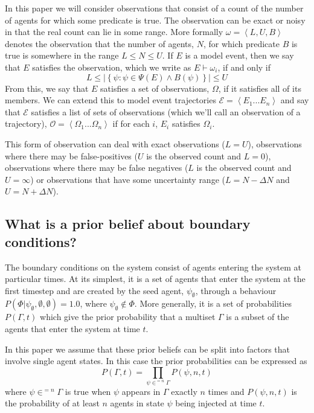\documentclass{article}
\begin{document}
In this paper we will consider observations that consist of a count of the number of agents for which some predicate is true. The observation can be exact or noisy in that the real count can lie in some range. More formally $\omega = \left<L,U,B\right>$ denotes the observation that the number of agents, $N$, for which predicate $B$ is true is somewhere in the range  $L \le N \le U$. If $E$ is a model event,  then we say that $E$ satisfies the observation, which we write as $E \vdash \omega_i$, if and only if
\[
L \le \left|\left\{\psi:\psi \in \Psi(E) \wedge B(\psi)\right\}\right| \le U
\]
From this, we say that $E$ satisfies a set of observations, $\Omega$, if it satisfies all of its members. We can extend this to model event trajectories $\mathcal{E} = \left<E_1...E_n\right>$ and say that $\mathcal{E}$ satisfies a list of sets of observations (which we'll call an observation of a trajectory), $\mathcal{O} = \left<\Omega_1...\Omega_n\right>$ if for each $i$, $E_i$ satisfies $\Omega_i$.

This form of observation can deal with exact observations ($L=U$), observations where there may be false-positives ($U$ is the observed count and $L=0$), observations where there may be false negatives ($L$ is the observed count and $U=\infty$) or observations that have some uncertainty range ($L = N - \Delta N$ and $U = N + \Delta N$).
 
\subsection{What is a prior belief about boundary conditions?}

The boundary conditions on the system consist of agents entering the system at particular times. At its simplest, it is a set of agents that enter the system at the first timestep and are created by the seed agent, $\psi_\emptyset$, through a behaviour $P(\Phi|\psi_\emptyset,\emptyset,\emptyset)=1.0$, where $\psi_\emptyset \notin \Phi$. More generally, it is a set of probabilities $P(\Gamma,t)$ which give the prior probability that a multiset $\Gamma$ is a subset of the agents that enter the system at time $t$.

In this paper we assume that these prior beliefs can be split into factors that involve single agent states. In this case the prior probabilities can be expressed as
\[
P(\Gamma,t) = \prod_{\psi \in^{=n} \Gamma} P(\psi,n,t)
\]
where $\psi\in^{=n}\Gamma$ is true when $\psi$ appears in $\Gamma$ exactly $n$ times and $P(\psi,n,t)$ is the probability of at least $n$ agents in state $\psi$ being injected at time $t$. 
\end{document}
